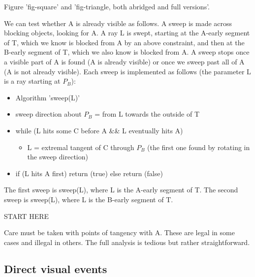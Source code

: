 \documentclass[12pt]{article}
\begin{document}
Figure 'fig-square' and 'fig-triangle, both abridged and full versions'.

We can test whether A is already visible as follows.
A sweep is made across blocking objects, looking for A.
A ray L is swept, starting at the A-early segment of T, which we know is blocked from A by an 
above constraint, and then at the B-early segment of T, which we also know is blocked from A.
A sweep stops once a visible part of A is found (A is already visible)
or once we sweep past all of A (A is not already visible).
Each sweep is implemented as follows (the parameter L is a ray starting at $P_B$):
\begin{itemize}
\item Algorithm 'sweep(L)'
\item sweep direction about $P_B$ = from L towards the outside of T
\item while (L hits some C before A \&\& L eventually hits A)
\begin{itemize}
\item L = extremal tangent of C through $P_B$ (the first one found by rotating in 
  the sweep direction)
\end{itemize}
\item if (L hits A first) return (true) else return (false) 
\end{itemize}
The first sweep is sweep(L), where L is the A-early segment of T.
The second sweep is sweep(L), where L is the B-early segment of T.


START HERE


Care must be taken with points of tangency with A.
These are legal in some cases and illegal in others.
The full analysis is tedious but rather straightforward.






\subsection{Direct visual events}

\end{document}
